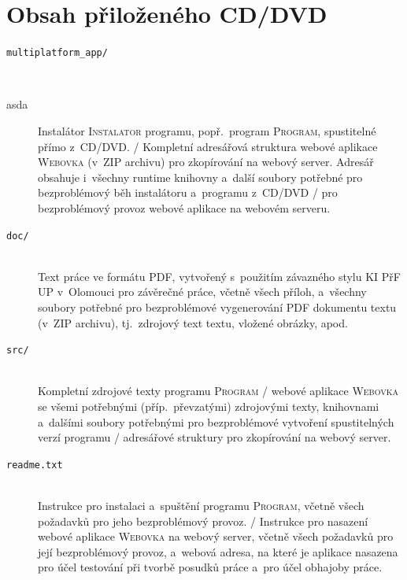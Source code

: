 \documentclass[
  glossaries,
]{kidiplom}
\begin{document}
\section{Obsah přiloženého CD/DVD} \label{sec:ObsahCD}
\begin{description}

\item[\texttt{multiplatform\_app/}] \hfill \\
	\item[asda]
  Instalátor \textsc{Instalator} programu, popř.~program
  \textsc{Program}, spustitelné přímo z~CD/DVD. / Kompletní adresářová
  struktura webové aplikace \textsc{Webovka} (v~ZIP archivu) pro
  zkopírování na webový server. Adresář obsahuje i~všechny runtime
  knihovny a~další soubory potřebné pro bezproblémový běh instalátoru
  a~programu z~CD/DVD / pro bezproblémový provoz webové aplikace na
  webovém serveru.

\item[\texttt{doc/}] \hfill \\
  Text práce ve formátu PDF, vytvořený s~použitím závazného stylu KI
  PřF UP v~Olomouci pro závěrečné práce, včetně všech příloh,
  a~všechny soubory potřebné pro bezproblémové vygenerování PDF
  dokumentu textu (v~ZIP archivu), tj.~zdrojový text textu, vložené
  obrázky, apod.

\item[\texttt{src/}] \hfill \\
  Kompletní zdrojové texty programu \textsc{Program} / webové aplikace
  \textsc{Webovka} se všemi potřebnými (příp.~převzatými) zdrojovými
  texty, knihovnami a~dalšími soubory potřebnými pro bezproblémové
  vytvoření spustitelných verzí programu / adresářové struktury pro
  zkopírování na webový server.

\item[\texttt{readme.txt}] \hfill \\
  Instrukce pro instalaci a~spuštění programu \textsc{Program}, včetně
  všech požadavků pro jeho bezproblémový provoz. / Instrukce pro
  nasazení webové aplikace \textsc{Webovka} na webový server, včetně
  všech požadavků pro její bezproblémový provoz, a~webová adresa, na
  které je aplikace nasazena pro účel testování při tvorbě posudků
  práce a~pro účel obhajoby práce.

\end{description}
\end{document}
